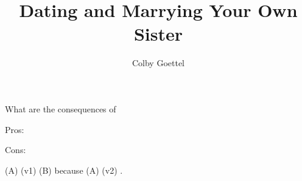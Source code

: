 \documentclass[12pt]{article}
\title{Dating and Marrying Your Own  Sister}
\author{Colby Goettel}
\begin{document}
\maketitle





What are the consequences of 

Pros: 

Cons: 

 (A) \uline{} (v1)  (B) because  (A) \uline{} (v2) .

\end{document}
